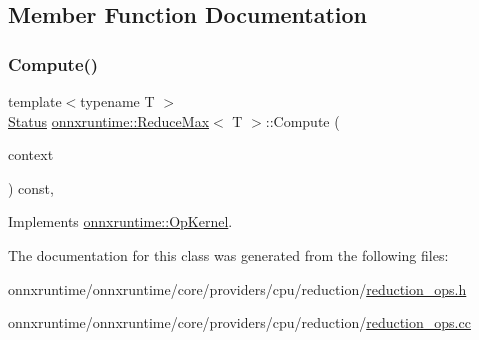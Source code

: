 \subsection{Member Function Documentation}
\mbox{\label{classonnxruntime_1_1ReduceMax_a27262f103f0521fe4c5d4e80174658c2}} 
\subsubsection{\texorpdfstring{Compute()}{Compute()}}
{\footnotesize\ttfamily template$<$typename T $>$ \\
\mbox{\hyperlink{classonnxruntime_1_1common_1_1Status}{Status}} \mbox{\hyperlink{classonnxruntime_1_1ReduceMax}{onnxruntime\+::\+Reduce\+Max}}$<$ T $>$\+::Compute (\begin{DoxyParamCaption}\item[{\mbox{\hyperlink{classonnxruntime_1_1OpKernelContext}{Op\+Kernel\+Context}} $\ast$}]{context }\end{DoxyParamCaption}) const\hspace{0.3cm}{\ttfamily [override]}, {\ttfamily [virtual]}}



Implements \mbox{\hyperlink{classonnxruntime_1_1OpKernel_a9eca8656a78b1b3ab9d3351a12798650}{onnxruntime\+::\+Op\+Kernel}}.



The documentation for this class was generated from the following files\+:\begin{DoxyCompactItemize}
\item 
onnxruntime/onnxruntime/core/providers/cpu/reduction/\mbox{\hyperlink{cpu_2reduction_2reduction__ops_8h}{reduction\+\_\+ops.\+h}}\item 
onnxruntime/onnxruntime/core/providers/cpu/reduction/\mbox{\hyperlink{cpu_2reduction_2reduction__ops_8cc}{reduction\+\_\+ops.\+cc}}\end{DoxyCompactItemize}
